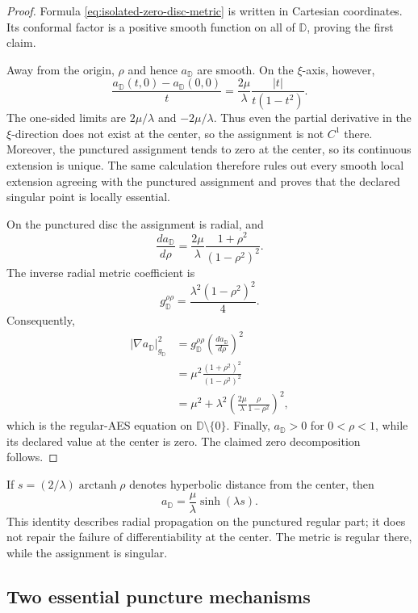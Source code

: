 \begin{proof}
Formula \eqref{eq:isolated-zero-disc-metric} is written in Cartesian
coordinates.  Its conformal factor is a positive smooth function on all of
\(\mathbb D\), proving the first claim.

Away from the origin, \(\rho\) and hence \(a_{\mathbb D}\) are smooth.  On the
\(\xi\)-axis, however,
\[
 \frac{a_{\mathbb D}(t,0)-a_{\mathbb D}(0,0)}{t}
 =\frac{2\mu}{\lambda}
  \frac{|t|}{t(1-t^2)}.
\]
The one-sided limits are \(2\mu/\lambda\) and
\(-2\mu/\lambda\).  Thus even the partial derivative in the \(\xi\)-direction
does not exist at the center, so the assignment is not \(C^1\) there.  Moreover,
the punctured assignment tends to zero at the center, so its continuous extension
is unique.  The same calculation therefore rules out every smooth local extension
agreeing with the punctured assignment and proves that the declared singular point
is locally essential.

On the punctured disc the assignment is radial, and
\[
 \frac{da_{\mathbb D}}{d\rho}
 =\frac{2\mu}{\lambda}
  \frac{1+\rho^2}{(1-\rho^2)^2}.
\]
The inverse radial metric coefficient is
\[
 g_{\mathbb D}^{\rho\rho}
 =\frac{\lambda^2(1-\rho^2)^2}{4}.
\]
Consequently,
\begin{align*}
 |\nabla a_{\mathbb D}|_{g_{\mathbb D}}^2
 &=g_{\mathbb D}^{\rho\rho}
   \left(\frac{da_{\mathbb D}}{d\rho}\right)^2\\
 &=\mu^2\frac{(1+\rho^2)^2}{(1-\rho^2)^2}\\
 &=\mu^2+
   \lambda^2
   \left(\frac{2\mu}{\lambda}
         \frac{\rho}{1-\rho^2}\right)^2,
\end{align*}
which is the regular-AES equation on
\(\mathbb D\setminus\{0\}\).  Finally,
\(a_{\mathbb D}>0\) for \(0<\rho<1\), while its declared value at the
center is zero.  The claimed zero decomposition follows.
\end{proof}

If \(s=(2/\lambda)\operatorname{arctanh}\rho\) denotes hyperbolic distance
from the center, then
\[
 a_{\mathbb D}=\frac{\mu}{\lambda}\sinh(\lambda s).
\]
This identity describes radial propagation on the punctured regular part; it
does not repair the failure of differentiability at the center.  The metric is
regular there, while the assignment is singular.

\subsection{Two essential puncture mechanisms}

